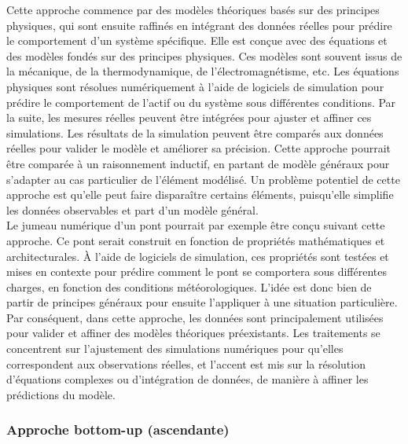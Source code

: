 Cette approche commence par des modèles théoriques basés sur des principes physiques, qui sont ensuite raffinés en intégrant des données réelles pour prédire le comportement d'un système spécifique. Elle est conçue avec des équations et des modèles fondés sur des principes physiques. Ces modèles sont souvent issus de la mécanique, de la thermodynamique, de l'électromagnétisme, etc. Les équations physiques sont résolues numériquement à l'aide de logiciels de simulation pour prédire le comportement de l'actif ou du système sous différentes conditions. Par la suite, les mesures réelles peuvent être intégrées pour ajuster et affiner ces simulations. Les résultats de la simulation peuvent être comparés aux données réelles pour valider le modèle et améliorer sa précision. Cette approche pourrait être comparée à un raisonnement inductif, en partant de modèle généraux pour s’adapter au cas particulier de l’élément modélisé. Un problème potentiel de cette approche est qu'elle peut faire disparaître certains éléments, puisqu’elle simplifie les données observables et part d’un modèle général.\\

Le jumeau numérique d’un pont pourrait par exemple être conçu suivant cette approche. Ce pont serait construit en fonction de propriétés mathématiques et architecturales. À l'aide de logiciels de simulation, ces propriétés sont testées et mises en contexte pour prédire comment le pont se comportera sous différentes charges, en fonction des conditions météorologiques. L’idée est donc bien de partir de principes généraux pour ensuite l’appliquer à une situation particulière.\\

Par conséquent, dans cette approche, les données sont principalement utilisées pour valider et affiner des modèles théoriques préexistants. Les traitements se concentrent sur l'ajustement des simulations numériques pour qu'elles correspondent aux observations réelles, et l'accent est mis sur la résolution d'équations complexes ou d'intégration de données, de manière à affiner les prédictions du modèle.

            \subsubsection{Approche bottom-up (ascendante)}

